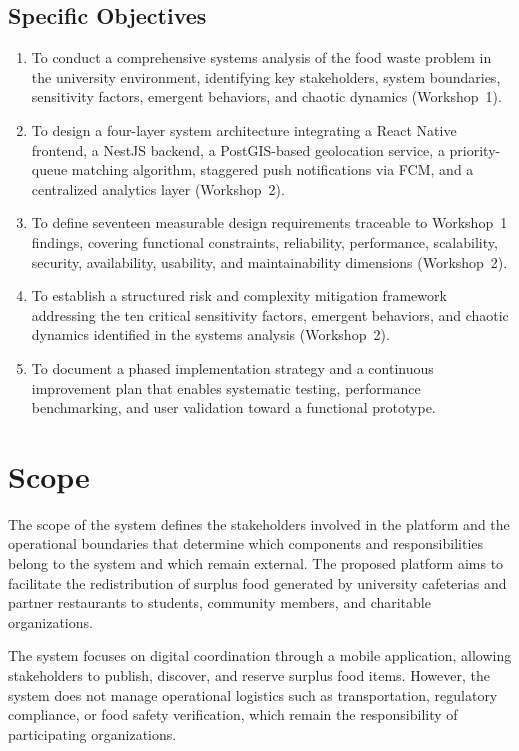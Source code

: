 \documentclass[conference]{IEEEtran}
\begin{document}
\subsection{Specific Objectives}

\begin{enumerate}
    \item To conduct a comprehensive systems analysis of the food waste problem in the university environment, identifying key stakeholders, system boundaries, sensitivity factors, emergent behaviors, and chaotic dynamics (Workshop~1).
    \item To design a four-layer system architecture integrating a React Native frontend, a NestJS backend, a PostGIS-based geolocation service, a priority-queue matching algorithm, staggered push notifications via FCM, and a centralized analytics layer (Workshop~2).
    \item To define seventeen measurable design requirements traceable to Workshop~1 findings, covering functional constraints, reliability, performance, scalability, security, availability, usability, and maintainability dimensions (Workshop~2).
    \item To establish a structured risk and complexity mitigation framework addressing the ten critical sensitivity factors, emergent behaviors, and chaotic dynamics identified in the systems analysis (Workshop~2).
    \item To document a phased implementation strategy and a continuous improvement plan that enables systematic testing, performance benchmarking, and user validation toward a functional prototype.
\end{enumerate}

\section{Scope}

The scope of the system defines the stakeholders involved in the platform and the operational boundaries that determine which components and responsibilities belong to the system and which remain external. The proposed platform aims to facilitate the redistribution of surplus food generated by university cafeterias and partner restaurants to students, community members, and charitable organizations.

The system focuses on digital coordination through a mobile application, allowing stakeholders to publish, discover, and reserve surplus food items. However, the system does not manage operational logistics such as transportation, regulatory compliance, or food safety verification, which remain the responsibility of participating organizations.
\end{document}

